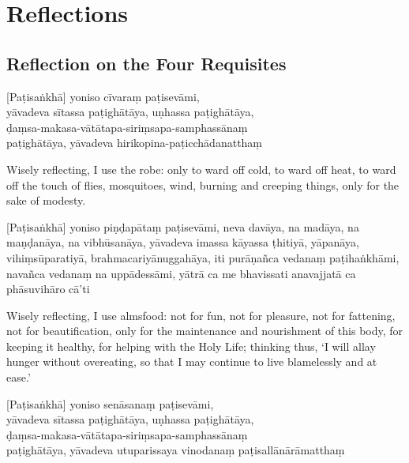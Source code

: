 \chapter{Reflections}

\section{Reflection on the Four Requisites}

\begin{leader}
\end{leader}


[Paṭisaṅkhā] yoniso cīvaraṃ paṭisevāmi,\\
yāvadeva sītassa paṭighātāya, uṇhassa paṭighātāya,\\
ḍaṃsa-makasa-vātātapa-siriṃsapa-samphassānaṃ\\
paṭighātāya, yāvadeva hirikopina-paṭicchādanatthaṃ

\begin{english}
  Wisely reflecting, I use the robe: only to ward off cold, to ward off heat, to
  ward off the touch of flies, mosquitoes, wind, burning and creeping things,
  only for the sake of modesty.
\end{english}

[Paṭisaṅkhā] yoniso piṇḍapātaṃ paṭisevāmi, neva davāya, na madāya, na maṇḍanāya,
na vibhūsanāya, yāvadeva imassa kāyassa ṭhitiyā, yāpanāya, vihiṃsūparatiyā,
brahmacariyānuggahāya, iti purāṇañca vedanaṃ paṭihaṅkhāmi, navañca vedanaṃ na
uppādessāmi, yātrā ca me bhavissati anavajjatā ca phāsuvihāro cā'ti

\begin{english}
  Wisely reflecting, I use almsfood: not for fun, not for pleasure, not for
  fattening, not for beautification, only for the maintenance and nourishment of
  this body, for keeping it healthy, for helping with the Holy Life; thinking
  thus, `I will allay hunger without overeating, so that I may continue to live
  blamelessly and at ease.'
\end{english}

[Paṭisaṅkhā] yoniso senāsanaṃ paṭisevāmi,\\
yāvadeva sītassa paṭighātāya, uṇhassa paṭighātāya,\\
ḍaṃsa-makasa-vātātapa-siriṃsapa-samphassānaṃ\\
paṭighātāya, yāvadeva utuparissaya vinodanaṃ paṭisallānārāmatthaṃ

